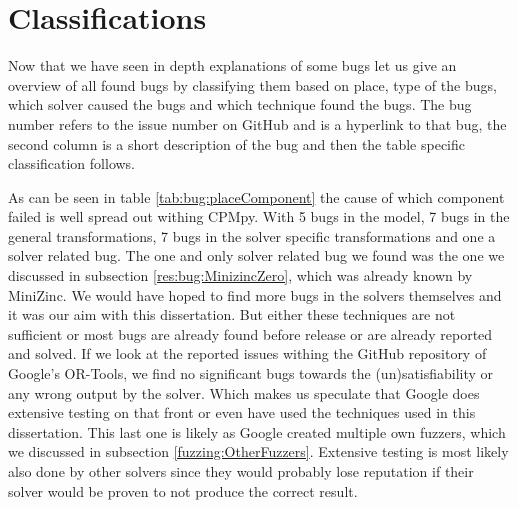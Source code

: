 %
%




\section{Classifications}
Now that we have seen in depth explanations of some bugs let us give an overview of all found bugs by classifying them based on place, type of the bugs, which solver caused the bugs and which technique found the bugs. The bug number refers to the issue number on GitHub and is a hyperlink to that bug, the second column is a short description of the bug and then the table specific classification follows.

As can be seen in table \ref{tab:bug:placeComponent} the cause of which component failed is well spread out withing CPMpy. 
With 5 bugs in the model, 7 bugs in the general transformations, 7 bugs in the solver specific transformations and one a solver related bug. The one and only solver related bug we found was the one we discussed in subsection \ref{res:bug:MinizincZero}, which was already known by MiniZinc. We would have hoped to find more bugs in the solvers themselves and it was our aim with this dissertation. But either these techniques are not sufficient or most bugs are already found before release or are already reported and solved.
If we look at the reported issues withing the GitHub repository of Google's OR-Tools, we find no significant bugs towards the (un)satisfiability or any wrong output by the solver. Which makes us speculate that Google does extensive testing on that front or even have used the techniques used in this dissertation. This last one is likely as Google created multiple own fuzzers, which we discussed in subsection  \ref{fuzzing:OtherFuzzers}. Extensive testing is most likely also done by other solvers since they would probably lose reputation if their solver would be proven to not produce the correct result.

